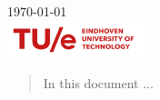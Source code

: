 \begin{titlepage}


{\large \today}\\[1cm]
\includegraphics[width=0.3\textwidth]{images/titlepage/tuelogo.png}\\[1cm] %
 
\begin{abstract}
In this document ...

\end{abstract}

\vfill %

\end{titlepage}